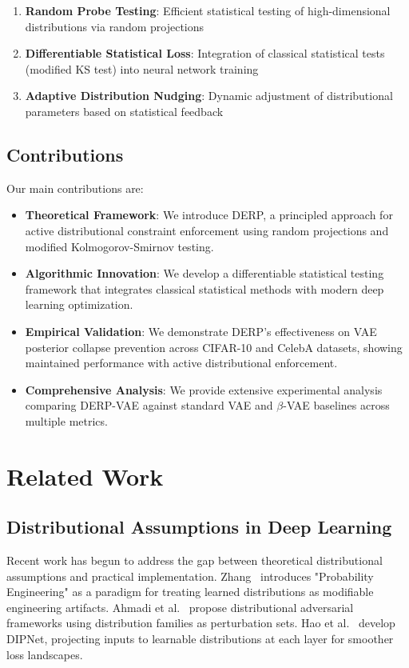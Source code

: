 \documentclass{article}
\begin{document}
\begin{enumerate}
    \item \textbf{Random Probe Testing}: Efficient statistical testing of high-dimensional distributions via random projections
    \item \textbf{Differentiable Statistical Loss}: Integration of classical statistical tests (modified KS test) into neural network training
    \item \textbf{Adaptive Distribution Nudging}: Dynamic adjustment of distributional parameters based on statistical feedback
\end{enumerate}

\subsection{Contributions}

Our main contributions are:

\begin{itemize}
    \item \textbf{Theoretical Framework}: We introduce DERP, a principled approach for active distributional constraint enforcement using random projections and modified Kolmogorov-Smirnov testing.
    \item \textbf{Algorithmic Innovation}: We develop a differentiable statistical testing framework that integrates classical statistical methods with modern deep learning optimization.
    \item \textbf{Empirical Validation}: We demonstrate DERP's effectiveness on VAE posterior collapse prevention across CIFAR-10 and CelebA datasets, showing maintained performance with active distributional enforcement.
    \item \textbf{Comprehensive Analysis}: We provide extensive experimental analysis comparing DERP-VAE against standard VAE and $\beta$-VAE baselines across multiple metrics.
\end{itemize}

\section{Related Work}

\subsection{Distributional Assumptions in Deep Learning}

Recent work has begun to address the gap between theoretical distributional assumptions and practical implementation. Zhang~\cite{zhang2025} introduces "Probability Engineering" as a paradigm for treating learned distributions as modifiable engineering artifacts. Ahmadi et al.~\cite{ahmadi2024} propose distributional adversarial frameworks using distribution families as perturbation sets. Hao et al.~\cite{hao2025} develop DIPNet, projecting inputs to learnable distributions at each layer for smoother loss landscapes.
\end{document}
